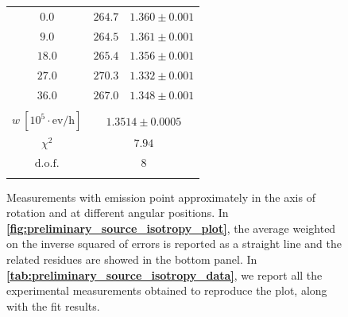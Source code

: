\documentclass[../../main/main.tex]{subfiles}
\begin{document}
\begin{figure}[h]
\begin{minipage}[c]{0.49\linewidth}
{{{\begin{tabular}{ccc}
                    \(   0.0 \) &   \( 264.7 \)   & \( 1.360 \pm 0.001 \) \\
                    \(   9.0 \) &   \( 264.5 \)   & \( 1.361 \pm 0.001 \) \\
                    \(  18.0 \) &   \( 265.4 \)   & \( 1.356 \pm 0.001 \) \\
                    \(  27.0 \) &   \( 270.3 \)   & \( 1.332 \pm 0.001 \) \\
                    \(  36.0 \) &   \( 267.0 \)   & \( 1.348 \pm 0.001 \) \\
                    \colrule
                    \multicolumn{3}{c}{\textbf{Fit results}}   \\
                    \colrule
                    {\boldmath\textbf{\( w \ \mathrm{[10^{5} \cdot ev/h]} \)}}  &   \multicolumn{2}{c}{\( 1.3514 \pm 0.0005 \)}   \\
                    {\boldmath\( \chi^{2} \)}  &   \multicolumn{2}{c}{\( 7.94 \)}   \\
                    {\boldmath\( \mathrm{d.o.f.} \)}  &   \multicolumn{2}{c}{\( 8 \)}   \\
                    \botrule
                \end{tabular}
            }
            }
            \label{tab:preliminary_source_isotropy_data}
        }
    \end{minipage}
    \caption{Measurements with emission point approximately in the axis of rotation and at different angular positions. In \textbf{\ref{fig:preliminary_source_isotropy_plot}}, the average weighted on the inverse squared of errors is reported as a straight line and the related residues are showed in the bottom panel. In \textbf{\ref{tab:preliminary_source_isotropy_data}}, we report all the experimental measurements obtained to reproduce the plot, along with the fit results.}
    \label{fig:preliminary_source_isotropy}
\end{figure}
\end{document}
